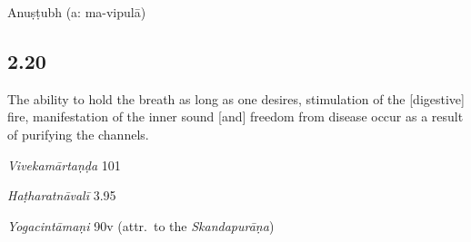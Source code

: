 \begin{ekdosis}
\begin{philcomm}[hp02_019]
\begin{versinnote}
\end{versinnote}
\end{philcomm}

\begin{metre}[hp02_019]
Anuṣṭubh (a: ma-vipulā)
\end{metre}

\subsection*{2.20}
\begin{translation}[hp02_020]
The ability to hold the breath as long as one desires, stimulation of the [digestive] fire, manifestation of the inner sound [and] freedom from disease occur as a result of purifying the channels.%
\end{translation}

\begin{sources}[hp02_020]
\emph{Vivekamārtaṇḍa} 101

\begin{versinnote}
\end{versinnote}
\end{sources}

\begin{testimonia}[hp02_020]
\emph{Haṭharatnāvalī} 3.95

\begin{versinnote}
\end{versinnote}

\emph{Yogacintāmaṇi} 90v (attr.~to the \emph{Skandapurāṇa})

\begin{versinnote}
\end{versinnote}


\end{testimonia}
\end{ekdosis}
